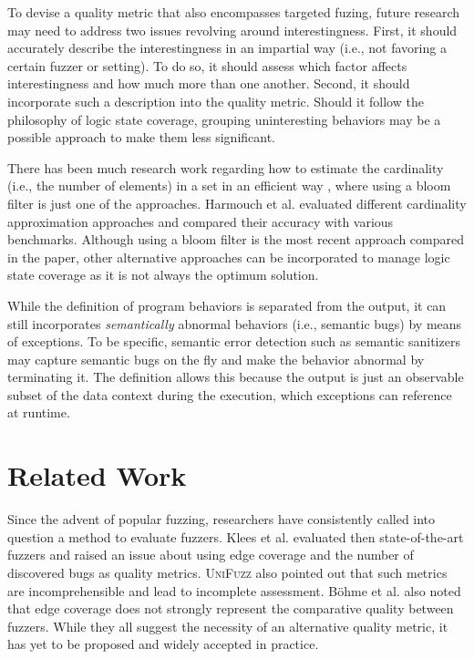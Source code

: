 \documentclass[letterpaper,twocolumn,10pt]{article}
\begin{document}
To devise a quality metric that also encompasses targeted fuzing, future
research may need to address two issues revolving around interestingness. First,
it should accurately describe the interestingness in an impartial way (i.e., not
favoring a certain fuzzer or setting). To do so, it should assess which factor
affects interestingness and how much more than one another. Second, it should
incorporate such a description into the quality metric. Should it follow the
philosophy of logic state coverage, grouping uninteresting behaviors may be a
possible approach to make them less significant.


%
There has been much research work regarding how to estimate the cardinality
(i.e., the number of elements) in a set in an efficient way
\cite{papapetrou2010cardinality,harmouch2017cardinality}, where using a bloom
filter is just one of the approaches. Harmouch et al.
\cite{harmouch2017cardinality} evaluated different cardinality approximation
approaches and compared their accuracy with various benchmarks.  Although using
a bloom filter is the most recent approach compared in the paper, other
alternative approaches can be incorporated to manage logic state coverage as it
is not always the optimum solution.


%
While the definition of program behaviors is separated from the output, it can
still incorporates \emph{semantically} abnormal behaviors (i.e., semantic bugs)
by means of exceptions. To be specific, semantic error detection such as
semantic sanitizers \cite{kim2019hydra,yun2016apisan} may capture semantic bugs
on the fly and make the behavior abnormal by terminating it. The definition
allows this because the output is just an observable subset of the data context
during the execution, which exceptions can reference at runtime.


\section{Related Work}

%
Since the advent of popular fuzzing, researchers have consistently
called into question a method to evaluate fuzzers. Klees et al.
\cite{klees2018evaluating} evaluated then state-of-the-art fuzzers and raised an
issue about using edge coverage and the number of discovered bugs as quality
metrics. \textsc{UniFuzz} \cite{li2021unifuzz} also pointed out that such
metrics are incomprehensible and lead to incomplete assessment. B\"{o}hme et al.
\cite{bohme2022reliability} also noted that edge coverage does not strongly
represent the comparative quality between fuzzers.  While they all suggest the
necessity of an alternative quality metric, it has yet to be proposed and widely
accepted in practice. 
\end{document}
